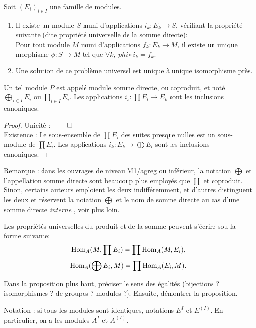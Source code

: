 \begin{propdef}
Soit $(E_i)_{i \in I}$ une famille de modules.
\begin{enumerate}
\item Il existe un module $S$ muni d'applications $i_k : E_k \to S$, vérifiant la propriété suivante (dite propriété universelle de la somme directe):\\
Pour tout module $M$ muni d'applications $f_k : E_k \to M$, il existe un unique morphisme $\phi : S \to M$ tel que $\forall k, \: phi \circ i_k=f_k$.
\item Une solution de ce problème universel est unique à unique isomorphisme près.
\end{enumerate}
Un tel module $P$ est appelé module somme directe, ou coproduit, et noté $\bigoplus_{i \in I} E_i$ ou $\coprod_{i \in I} E_i$. Les applications $i_k : \prod E_l \to E_k$ sont les inclusions canoniques.
\end{propdef}



\begin{proof}
Unicité : $\qed$\\
Existence : Le sous-ensemble de $\prod E_i$ des suites presque nulles est un sous-module de $\prod E_i$. Les applications $i_k: E_k\to \bigoplus E_l$ sont les inclusions canoniques.
\end{proof}

Remarque : dans les ouvrages de niveau M1/agreg ou inférieur, la notation $\bigoplus$ et l'appellation \og somme directe\fg{} sont beaucoup plus employés que $\coprod$ et \og coproduit\fg. Sinon, certains auteurs emploient les deux indifféremment, et d'autres distinguent les deux et réservent la notation $\bigoplus$ et le nom de somme directe au cas d'une somme directe \emph{interne} , voir plus loin.



\begin{proposition}
Les propriétés universelles du produit et de la somme peuvent s'écrire sou la forme suivante:
\[ \operatorname{Hom}_A(M,\prod E_i) = \prod \operatorname{Hom}_A(M, E_i),\]
\[ \operatorname{Hom}_A(\bigoplus E_i,M) = \prod \operatorname{Hom}_A(E_i,M).\]
\end{proposition}

\begin{exo}
Dans la proposition plus haut, préciser le sens des égalités (bijections ? isomorphismes ? de groupes ? modules ?). Ensuite, démontrer la proposition.
\end{exo}

Notation : si tous les modules sont identiques, notations $E^I$ et $E^{(I)}$. En particulier, on a les modules $A^I$ et $A^{(I)}$.


